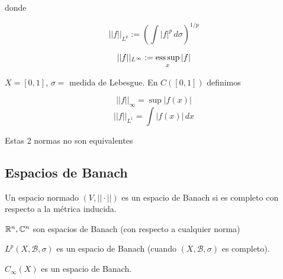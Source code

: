 donde 

\[||f||_{L^p}:= \left(\int |f|^p\,d\sigma\right)^{1/p}\]

\[||f||_{L^\infty}:=\operatorname*{ess\,sup}_x |f|\]

\begin{fexample}
    $X=[0,1]$, $\sigma=$ medida de Lebesgue. En $C([0,1])$ definimos

    \[||f||_\infty =\sup |f(x)|\]
    \[||f||_{L^1}=\int |f(x)|\,dx\]

    Estas 2 normas \color{red} no son equivalentes \color{black}
\end{fexample}

\subsection{Espacios de Banach}

\begin{fdefinition}
    Un espacio normado $(V,||\cdot||)$ es un espacio de Banach si es \color{red} completo \color{black} con respecto a la métrica inducida.
\end{fdefinition}

\begin{fexample}
    $\mathbb{R}^n,\mathbb{C}^n$ son espacios de Banach (con respecto a cualquier norma)
    
    $L^p(X,\mathcal{B},\sigma)$ es un espacio de Banach (cuando $(X,\mathcal{B},\sigma)$ es completo).
\end{fexample}

\begin{fproposition}
    $C_\infty(X)$ es un espacio de Banach.
\end{fproposition}

